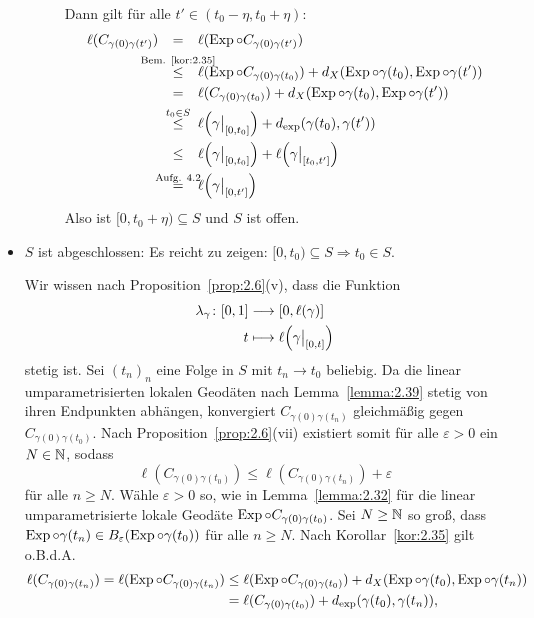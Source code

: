 \begin{beweis}
\begin{itemize}
\begin{description}
			Dann gilt für alle $t' \in (t_0 - \eta, t_0 + \eta)$:
			\begin{align*}
				\ell(C_{\gamma(0)\gamma(t')}) &\stack{}{=} \ell(\Exp \circ C_{\gamma(0)\gamma(t')}) \\
				&\stack{\text{Bem. \ref{kor:2.35}}}{\leq} \ell(\Exp \circ C_{\gamma(0)\gamma(t_0)}) + d_X(\Exp \circ \gamma(t_0),\Exp \circ \gamma(t')) \\
				&\stack{}{=} \ell(C_{\gamma(0)\gamma(t_0)}) + d_X(\Exp \circ \gamma(t_0),\Exp \circ \gamma(t')) \\
				&\stack{t_0 \in S}{\leq} \ell\enbrace*{\gamma \big|_{[0,t_0]}} + d_{\exp}(\gamma(t_0),\gamma(t')) \\
				&\stack{}{\leq} \ell\enbrace*{\gamma \big|_{[0,t_0]}} + \ell\enbrace*{\gamma \big|_{[t_0,t']}} \\
				&\stack{\text{Aufg. 4.2}}{=} \ell\enbrace*{\gamma \big|_{[0,t']}}
			\end{align*}
			Also ist $[0,t_0 + \eta) \subseteq S$ und $S$ ist offen.
		\end{description}
		\item $S$ ist abgeschlossen:
		Es reicht zu zeigen: $[0,t_0) \subseteq S \Rightarrow t_0 \in S$.
		
		Wir wissen nach Proposition~\ref{prop:2.6}(v), dass die Funktion
		\begin{align}
			\lambda_\gamma\colon [0,1] &\longrightarrow [0,\ell(\gamma)] \label{eq:2.40.1}\\
			t &\longmapsto \ell\enbrace*{\gamma \big|_{[0,t]}}
		\end{align}
		stetig ist.
		Sei $(t_n)_n$ eine Folge in $S$ mit $t_n \rightarrow t_0$ beliebig.
		Da die linear umparametrisierten lokalen Geodäten nach Lemma~\ref{lemma:2.39} stetig von ihren Endpunkten abhängen, konvergiert $C_{\gamma(0)\gamma(t_n)}$ gleichmäßig gegen $C_{\gamma(0)\gamma(t_0)}$.
		Nach Proposition~\ref{prop:2.6}(vii) existiert somit für alle $\varepsilon > 0$ ein $N \in \mathbb{N}$, sodass
		\begin{equation}
			\ell(C_{\gamma(0)\gamma(t_0)}) \leq \ell(C_{\gamma(0)\gamma(t_n)}) + \varepsilon \label{eq:2.40.2}
		\end{equation}
		für alle $n \geq N$.
		Wähle $\varepsilon > 0$ so, wie in Lemma~\ref{lemma:2.32} für die linear umparametrisierte lokale Geodäte $\operatorname{Exp} \circ C_{\gamma(0)\gamma(t_0)}$.
		Sei $N \geq \mathbb{N}$ so groß, dass $\operatorname{Exp} \circ \gamma(t_n) \in B_\varepsilon(\operatorname{Exp} \circ \gamma(t_0))$ für alle $n \geq N$.
		Nach Korollar~\ref{kor:2.35} gilt o.B.d.A.
		\begin{align}
			\ell(C_{\gamma(0)\gamma(t_n)}) = \ell(\operatorname{Exp} \circ C_{\gamma(0)\gamma(t_n)}) &\leq \ell(\operatorname{Exp} \circ C_{\gamma(0)\gamma(t_0)}) + d_X(\operatorname{Exp} \circ \gamma(t_0),\operatorname{Exp} \circ \gamma(t_n)) \\
			&= \ell(C_{\gamma(0)\gamma(t_0)}) + d_{\exp}(\gamma(t_0),\gamma(t_n)), \label{eq:2.40.3}
		\end{align}
		

\end{itemize}
\end{beweis}
